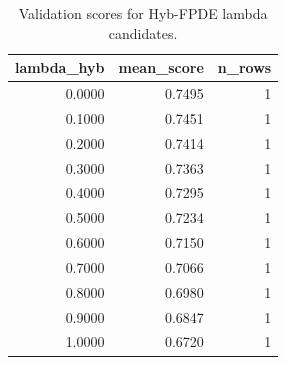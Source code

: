 \begin{table}[t]
\caption{Validation scores for Hyb-FPDE lambda candidates.}
\label{tab:lambda_distribution_computed}
\centering
\begin{tabular}{rrr}
\toprule
lambda\_hyb & mean\_score & n\_rows \\
\midrule
0.0000 & 0.7495 & 1 \\
0.1000 & 0.7451 & 1 \\
0.2000 & 0.7414 & 1 \\
0.3000 & 0.7363 & 1 \\
0.4000 & 0.7295 & 1 \\
0.5000 & 0.7234 & 1 \\
0.6000 & 0.7150 & 1 \\
0.7000 & 0.7066 & 1 \\
0.8000 & 0.6980 & 1 \\
0.9000 & 0.6847 & 1 \\
1.0000 & 0.6720 & 1 \\
\bottomrule
\end{tabular}

\end{table}
